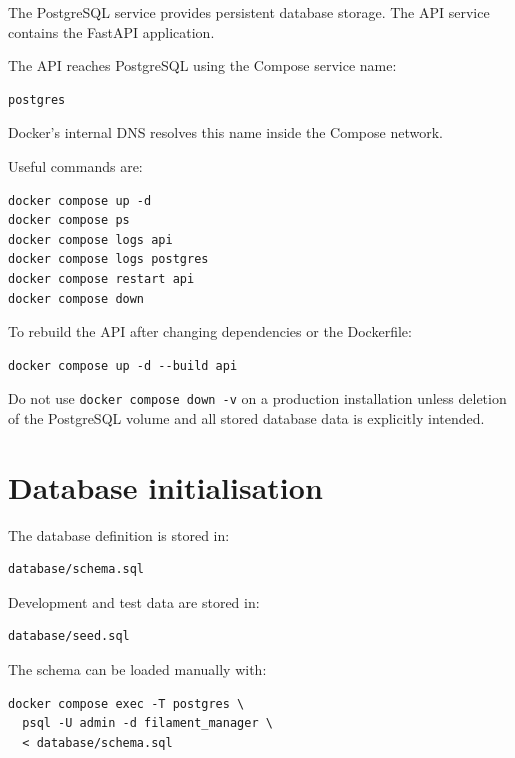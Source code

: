 \documentclass[a4paper,11pt]{article}
\begin{document}
The PostgreSQL service provides persistent database storage. The API service
contains the FastAPI application.

The API reaches PostgreSQL using the Compose service name:

\begin{lstlisting}
postgres
\end{lstlisting}

Docker's internal DNS resolves this name inside the Compose network.

Useful commands are:

\begin{lstlisting}
docker compose up -d
docker compose ps
docker compose logs api
docker compose logs postgres
docker compose restart api
docker compose down
\end{lstlisting}

To rebuild the API after changing dependencies or the Dockerfile:

\begin{lstlisting}
docker compose up -d --build api
\end{lstlisting}

\begin{warnbox}
Do not use \texttt{docker compose down -v} on a production installation
unless deletion of the PostgreSQL volume and all stored database data is
explicitly intended.
\end{warnbox}

\section{Database initialisation}

The database definition is stored in:

\begin{lstlisting}
database/schema.sql
\end{lstlisting}

Development and test data are stored in:

\begin{lstlisting}
database/seed.sql
\end{lstlisting}

The schema can be loaded manually with:

\begin{lstlisting}
docker compose exec -T postgres \
  psql -U admin -d filament_manager \
  < database/schema.sql
\end{lstlisting}
\end{document}
